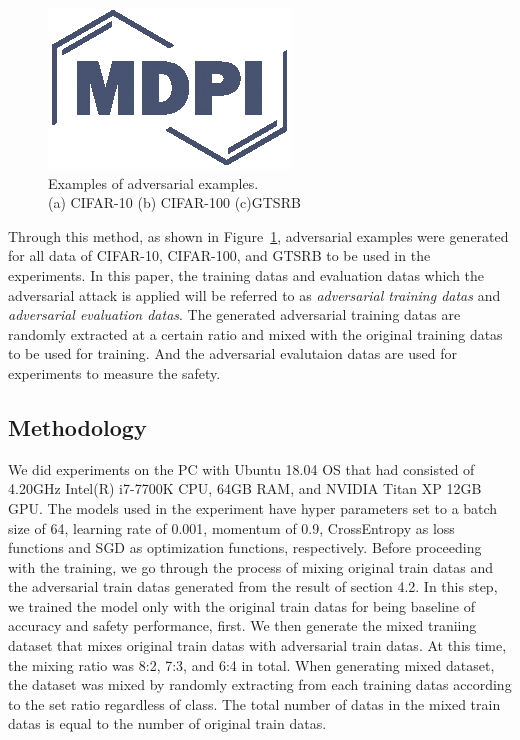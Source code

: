 \documentclass[journal,article,submit,moreauthors,pdftex]{Definitions/mdpi}
\begin{document}
\begin{figure}[H] 
\includegraphics[width=5 cm]{Definitions/logo-mdpi}
\caption{Examples of adversarial examples.\\(a) CIFAR-10 (b) CIFAR-100 (c)GTSRB\label{fig5}}
\end{figure} 

Through this method, as shown in Figure~\ref{fig5}, adversarial examples were generated for all data of CIFAR-10, CIFAR-100, and GTSRB to be used in the experiments.
In this paper, the training datas and evaluation datas which the adversarial attack is applied will be referred to as {\it adversarial training datas} and {\it adversarial evaluation datas}.
The generated adversarial training datas are randomly extracted at a certain ratio and mixed with the original training datas to be used for training. And the adversarial evalutaion datas are used for experiments to measure the safety.

\subsection{Methodology}

We did experiments on the PC with Ubuntu 18.04 OS that had consisted of 4.20GHz Intel(R) i7-7700K CPU, 64GB RAM, and NVIDIA Titan XP 12GB GPU. The models used in the experiment have hyper parameters set to a batch size of 64, learning rate of 0.001, momentum of 0.9, CrossEntropy as loss functions and SGD as optimization functions, respectively.
Before proceeding with the training, we go through the process of mixing original train datas and the adversarial train datas generated from the result of section 4.2.
In this step, we trained the model only with the original train datas for being baseline of accuracy and safety performance, first. We then generate the mixed traniing dataset that mixes original train datas with adversarial train datas.
At this time, the mixing ratio was 8:2, 7:3, and 6:4 in total. When generating mixed dataset, the dataset was mixed by randomly extracting from each training datas according to the set ratio regardless of class.
The total number of datas in the mixed train datas is equal to the number of original train datas.
\end{document}

